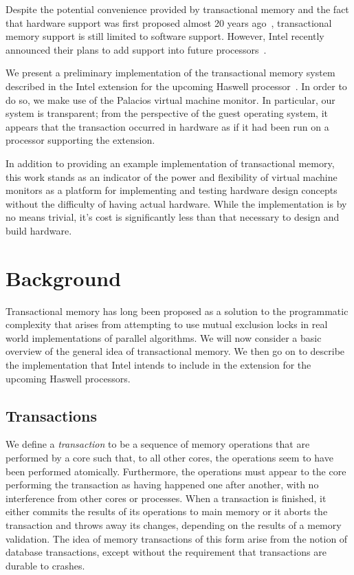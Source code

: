 \documentclass{acm_proc_article-sp}
\begin{document}
Despite the potential convenience provided by transactional memory and the fact
that hardware support was first proposed almost 20 years ago~\cite{Herlihy:1993:TMA:173682.165164},
transactional memory support is still limited to software support. However,
Intel recently announced their plans to add support into future
processors~\cite{intelsys}.

We present a preliminary implementation of the transactional memory system
described in the Intel extension for the upcoming Haswell
processor~\cite{intelsys}.  In order to do so, we make use of the Palacios
virtual machine monitor. In particular, our system is transparent; from the
perspective of the guest operating system, it appears that the transaction
occurred in hardware as if it had been run on a processor supporting the
extension. 

In addition to providing an example implementation of transactional memory,
this work stands as an indicator of the power and flexibility of virtual
machine monitors as a platform for implementing and testing hardware design
concepts without the difficulty of having actual hardware. While the
implementation is by no means trivial, it's cost is significantly less than
that necessary to design and build hardware.  

\section{Background}

Transactional memory has long been proposed as a solution to the programmatic
complexity that arises from attempting to use mutual exclusion locks in real
world implementations of parallel algorithms. We will now consider a basic
overview of the general idea of transactional memory. We then go on to describe
the implementation that Intel intends to include in the extension for the
upcoming Haswell processors.

\subsection{Transactions} 

We define a \emph{transaction} to be a sequence of memory operations that are
performed by a core such that, to all other cores, the operations
seem to have been performed atomically. Furthermore, the operations must appear
to the core  performing the transaction as having happened one after
another, with no interference from other cores or processes.  When a transaction is
finished, it either commits the results of its operations to main memory or it
aborts the transaction and throws away its changes, depending on the results of
a memory validation. The idea of memory transactions of this form arise from
the notion of database transactions, except without the requirement that
transactions are durable to crashes. 
\end{document}
